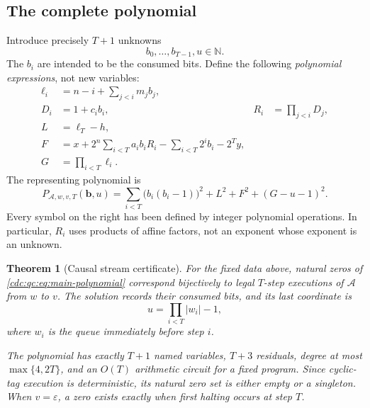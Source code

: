 \documentclass[11pt,a4paper]{article}
\newtheorem{theorem}{Theorem}[section]
\theoremstyle{definition}
\theoremstyle{remark}
\newcommand{\N}{\mathbb N}
\newcommand{\eps}{\varepsilon}
\newcommand{\CT}{\mathcal A}
\begin{document}
\subsection{The complete polynomial}
Introduce precisely $T+1$ unknowns
\[
 b_0,\ldots,b_{T-1},u\in\N.
\]
The $b_i$ are intended to be the consumed bits. Define the following \emph{polynomial expressions}, not new variables:
\begin{align}
 \ell_i&=n-i+\sum_{j<i}m_jb_j,\label{cdc:qc:eq:lengths}\\
 D_i&=1+c_i b_i, & R_i&=\prod_{j<i}D_j,\label{cdc:qc:eq:prefixes}\\
 L&=\ell_T-h,\label{cdc:qc:eq:L}\\
 F&=x+2^n\sum_{i<T}a_i b_iR_i
       -\sum_{i<T}2^i b_i-2^T y,\label{cdc:qc:eq:F}\\
 G&=\prod_{i<T}\ell_i.\label{cdc:qc:eq:G}
\end{align}
The representing polynomial is
\begin{equation}\label{cdc:qc:eq:main-polynomial}
 \boxed{\displaystyle
 P_{\CT,w,v,T}(\mathbf b,u)
 =\sum_{i<T}\bigl(b_i(b_i-1)\bigr)^2+L^2+F^2+(G-u-1)^2.}
\end{equation}
Every symbol on the right has been defined by integer polynomial operations. In particular, $R_i$ uses products of affine factors, not an exponent whose exponent is an unknown.

\begin{theorem}[Causal stream certificate]\label{cdc:qc:thm:stream}
For the fixed data above, natural zeros of \eqref{cdc:qc:eq:main-polynomial} correspond bijectively to legal $T$-step executions of $\CT$ from $w$ to $v$. The solution records their consumed bits, and its last coordinate is
\[
 u=\prod_{i<T}|w_i|-1,
\]
where $w_i$ is the queue immediately before step $i$.

The polynomial has exactly $T+1$ named variables, $T+3$ residuals, degree at most $\max\{4,2T\}$, and an $O(T)$ arithmetic circuit for a fixed program. Since cyclic-tag execution is deterministic, its natural zero set is either empty or a singleton. When $v=\eps$, a zero exists exactly when first halting occurs at step $T$.
\end{theorem}
\end{document}
